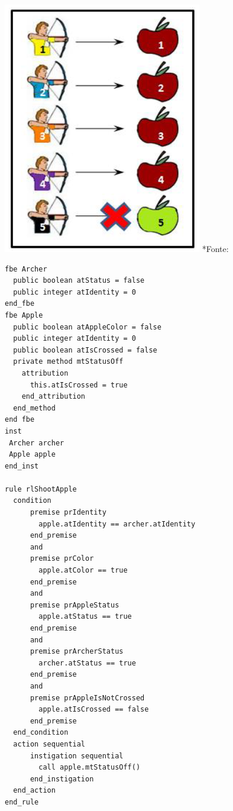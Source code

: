 \noindent
\begin{minipage}{.45\textwidth}
  \centering
  \includegraphics[width=.8\textwidth]{../figures/mira_alvo.png}
  *{Fonte: }
  \label{fig:mira_alvo}
\end{minipage}\hfill
\begin{minipage}{.45\textwidth}
  \begin{lstlisting}[caption = {\textit{FBEs} e \textit{Rule} para cenário do Mira ao Alvo},
    source = {\citeonline{chierichi_2020}}, language=nopl,
    label = {cod:mira_alvo_fbe}]
fbe Archer
  public boolean atStatus = false
  public integer atIdentity = 0
end_fbe
fbe Apple
  public boolean atAppleColor = false
  public integer atIdentity = 0
  public boolean atIsCrossed = false
  private method mtStatusOff
    attribution
      this.atIsCrossed = true
    end_attribution
  end_method
end fbe
inst
 Archer archer
 Apple apple
end_inst

rule rlShootApple
  condition
      premise prIdentity
        apple.atIdentity == archer.atIdentity
      end_premise
      and
      premise prColor
        apple.atColor == true
      end_premise
      and
      premise prAppleStatus
        apple.atStatus == true
      end_premise
      and
      premise prArcherStatus
        archer.atStatus == true
      end_premise
      and
      premise prAppleIsNotCrossed
        apple.atIsCrossed == false
      end_premise
  end_condition
  action sequential
      instigation sequential
        call apple.mtStatusOff()
      end_instigation
  end_action
end_rule
  \end{lstlisting}
\end{minipage}

